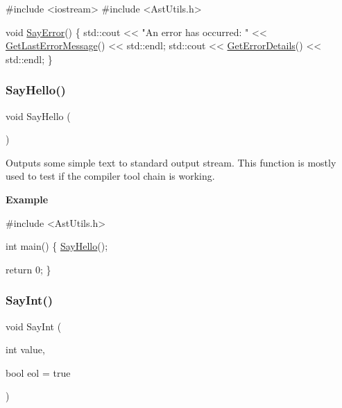 \begin{DoxyCode}
\textcolor{preprocessor}{#include <iostream>}
\textcolor{preprocessor}{#include <AstUtils.h>}

\textcolor{keywordtype}{void} \hyperlink{group__io__group_gaa8fd8044fbf35d58e73087b6399cd82a}{SayError}()
\{
  std::cout << \textcolor{stringliteral}{"An error has occurred: "} << \hyperlink{group__error__group_gac9be83c8ac2a5d80a2be46487c596eab}{GetLastErrorMessage}() << std::endl;
  std::cout << \hyperlink{group__error__group_ga8258f5044a56ed71aeed5633fc8341b6}{GetErrorDetails}() << std::endl;
\}
\end{DoxyCode}
 \mbox{\label{group__io__group_ga43fd6e7b7a627ba82ff93795559479f8}} 
\subsubsection{\texorpdfstring{Say\+Hello()}{SayHello()}}
{\footnotesize\ttfamily void Say\+Hello (\begin{DoxyParamCaption}{ }\end{DoxyParamCaption})}

Outputs some simple text to standard output stream. This function is mostly used to test if the compiler tool chain is working.

{\bfseries Example}


\begin{DoxyCode}
\textcolor{preprocessor}{#include <AstUtils.h>}

\textcolor{keywordtype}{int} main()
\{
  \hyperlink{group__io__group_ga43fd6e7b7a627ba82ff93795559479f8}{SayHello}();

  \textcolor{keywordflow}{return} 0;
\}
\end{DoxyCode}
 \mbox{\label{group__io__group_gaa78da65e44d9ab5e70c79ed77f62b86a}} 
\subsubsection{\texorpdfstring{Say\+Int()}{SayInt()}}
{\footnotesize\ttfamily void Say\+Int (\begin{DoxyParamCaption}\item[{int}]{value,  }\item[{bool}]{eol = {\ttfamily true} }\end{DoxyParamCaption})}

